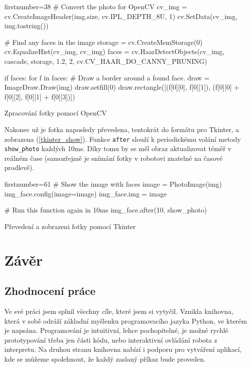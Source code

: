 \documentclass[12pt,notitlepage]{report}
\newcommand{\code}[1]{\texttt{\small #1}}
\begin{document}
\begin{listing}
\begin{pyc*}{firstnumber=38}
    # Convert the photo for OpenCV
    cv_img = cv.CreateImageHeader(img.size, cv.IPL_DEPTH_8U, 1)
    cv.SetData(cv_img, img.tostring())

    # Find any faces in the image
    storage = cv.CreateMemStorage(0)
    cv.EqualizeHist(cv_img, cv_img)
    faces = cv.HaarDetectObjects(cv_img, 
                cascade, 
                storage, 
                1.2, 2,
                cv.CV_HAAR_DO_CANNY_PRUNING)

    if faces:
        for f in faces:
            # Draw a border around a found face.
            draw = ImageDraw.Draw(img)
            draw.setfill(0)
            draw.rectangle([(f[0][0],
                             f[0][1]),
                            (f[0][0] + f[0][2],
                             f[0][1] + f[0][3])])
\end{pyc*}
\caption{Zpracování fotky pomocí OpenCV}
\label{opencv_part}
\end{listing}

Nakonec už je fotka naposledy převedena, tentokrát do formátu pro Tkinter, a
zobrazena (\ref{tkinter_show}). Funkce \code{after} slouží k periodickému
volání metody \code{show\_photo} každých 10ms. Díky tomu by se měl obraz
aktualizovat téměř v reálném čase (samozřejmě je snímání fotky v robotovi
znatelné na časové prodlevě).

\begin{listing}
\begin{pyc*}{firstnumber=61}
    # Show the image with faces
    image = PhotoImage(img)
    img_face.config(image=image)
    img_face.img = image

    # Run this function again in 10ms
    img_face.after(10, show_photo)
\end{pyc*}
\caption{Převedení a zobrazeni fotky pomocí Tkinter}
\label{tkinter_show}
\end{listing}
\chapter{Závěr} %

    \section{Zhodnocení práce}

    Ve své práci jsem splnil všechny cíle, které jsem si vytyčil. Vznikla
    knihovna, která v sobě odráží základní myšlenku programovacího jazyka
    Python, ve kterém je napsána. Programování je intuitivní, lehce
    pochopitelné, je možné rychlé prototypování třeba jen části kódu, nebo
    interaktivní ovládání robota z interpretu. Na druhou stranu knihovna nabízí
    i podporu pro vytváření aplikací, kde se můžeme spolehnout, že každý
    zaslaný příkaz bude proveden.
\end{document}
